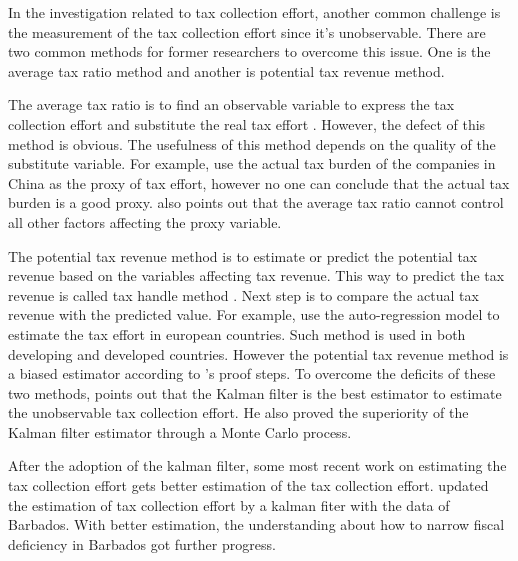 \documentclass[man]{apa7}
\begin{document}
In the investigation related to tax collection effort, another common challenge is the measurement of the tax collection effort since it's unobservable. There are two common methods for former researchers to overcome this issue. One is the average tax ratio method and another is potential tax revenue method.

The average tax ratio is to find an observable variable to express the tax collection effort and substitute the real tax effort \parencite{1981Taxation,1996Revenue1}. However, the defect of this method is obvious. The usefulness of this method depends on the quality of the substitute variable. For example, \textcite{lv2008taxeffort} use the actual tax burden of the companies in China as the proxy of tax effort, however no one can conclude that the actual tax burden is a good proxy. \textcite{doi:10.1080/13504850500425345} also points out that the average tax ratio cannot control all other factors affecting the proxy variable.

The potential tax revenue method is to estimate or predict the potential tax revenue based on the variables affecting tax revenue. This way to predict the tax revenue is called tax handle method \parencite{1968How}. Next step is to compare the actual tax revenue with the predicted value. For example, \Textcite{2019AAAVVV} use the auto-regression model to estimate the tax effort in european countries. Such method is used in both developing and developed countries\parencite{2002The,2007Determinants,201703}. However the potential tax revenue method is a biased estimator according to \textcite{doi:10.1080/13504850500425345}'s proof steps. To overcome the deficits of these two methods, \textcite{doi:10.1080/13504850500425345} points out that the Kalman filter is the best estimator to estimate the unobservable tax collection effort. He also proved the superiority of the Kalman filter estimator through a Monte Carlo process.

After the adoption of the kalman filter, some most recent work on estimating the tax collection effort gets better estimation of the tax collection effort. \Textcite{2010MEASURING} updated the estimation of tax collection effort by a kalman fiter with the data of Barbados. With better estimation,  the understanding about how to narrow fiscal deficiency in Barbados got further progress.
\end{document}

